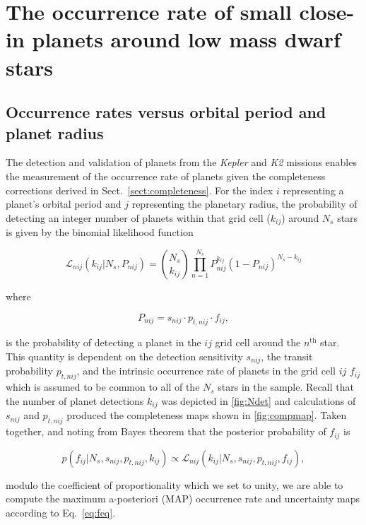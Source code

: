 \documentclass[twocolumn]{emulateapj}
\newcommand{\kepler}[1]{\emph{Kepler}#1}
\newcommand{\ktwo}[1]{\emph{K2}#1}
\begin{document}
\section{The occurrence rate of small close-in planets around low mass dwarf stars} \label{sect:occurrence}
\subsection{Occurrence rates versus orbital period and planet radius} \label{sect:fmap}
The detection and validation of planets from the \kepler{} and \ktwo{} missions enables the measurement of the
occurrence rate of planets given the completeness corrections derived in Sect.~\ref{sect:completeness}.
For the index $i$ representing a planet's orbital period and $j$ representing the planetary
radius, the probability of detecting an integer number of planets within that grid cell ($k_{ij}$) around
$N_s$ stars is given by the binomial likelihood function

\begin{equation}
  \mathcal{L}_{nij}(k_{ij}|N_s,P_{nij}) = \binom{N_s}{k_{ij}} \prod_{n=1}^{N_s} P_{nij}^{k_{ij}} (1-P_{nij})^{N_s-k_{ij}}
  \label{eq:lnL}
\end{equation}

\noindent where

\begin{equation}
  P_{nij} = s_{nij} \cdot p_{t,nij} \cdot f_{ij},
  \label{eq:prob}
\end{equation}

\noindent is the probability of detecting a planet in the $ij$ grid cell around the $n^{\text{th}}$ star.
This quantity is dependent on the detection sensitivity $s_{nij}$, the transit probability $p_{t,nij}$, and the 
intrinsic occurrence rate of planets in the grid cell $ij$ $f_{ij}$ which is assumed to be common to all
of the $N_s$ stars in the sample.
Recall that the number of planet detections $k_{ij}$ was depicted in \autoref{fig:Ndet} and
calculations of $s_{nij}$ and $p_{t,nij}$ produced the completeness maps shown in \autoref{fig:compmap}. 
Taken together, and noting from Bayes theorem that the posterior probability of $f_{ij}$ is 

\begin{equation}
  p(f_{ij}|N_s,s_{nij},p_{t,nij},k_{ij}) \propto \mathcal{L}_{nij}(k_{ij}|N_s,s_{nij},p_{t,nij},f_{ij}),
  \label{eq:feq}
\end{equation}
  
\noindent modulo the coefficient of proportionality which we set to unity, we are able to compute
the maximum a-posteriori (MAP) occurrence rate and uncertainty maps according to Eq.~\ref{eq:feq}.
\end{document}
